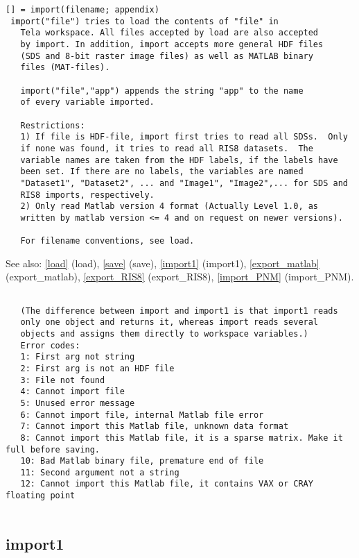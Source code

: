 \documentclass[a4paper]{article}
\begin{document}
\begin{tscreen}
\begin{verbatim}
[] = import(filename; appendix)
 import("file") tries to load the contents of "file" in
   Tela workspace. All files accepted by load are also accepted
   by import. In addition, import accepts more general HDF files
   (SDS and 8-bit raster image files) as well as MATLAB binary
   files (MAT-files).
   
   import("file","app") appends the string "app" to the name
   of every variable imported.
   
   Restrictions:
   1) If file is HDF-file, import first tries to read all SDSs.  Only
   if none was found, it tries to read all RIS8 datasets.  The
   variable names are taken from the HDF labels, if the labels have
   been set. If there are no labels, the variables are named
   "Dataset1", "Dataset2", ... and "Image1", "Image2",... for SDS and
   RIS8 imports, respectively.
   2) Only read Matlab version 4 format (Actually Level 1.0, as
   written by matlab version <= 4 and on request on newer versions).
   
   For filename conventions, see load.
\end{verbatim}

See also: \ref{load} {(load)}, \ref{save} {(save)}, \ref{import1} {(import1)}, \ref{export_matlab} {(export\_matlab)}, \ref{export_RIS8} {(export\_RIS8)}, \ref{import_PNM} {(import\_PNM)}.
\begin{verbatim}
   
   (The difference between import and import1 is that import1 reads
   only one object and returns it, whereas import reads several
   objects and assigns them directly to workspace variables.)
   Error codes:
   1: First arg not string
   2: First arg is not an HDF file
   3: File not found
   4: Cannot import file
   5: Unused error message
   6: Cannot import file, internal Matlab file error
   7: Cannot import this Matlab file, unknown data format
   8: Cannot import this Matlab file, it is a sparse matrix. Make it full before saving.
   10: Bad Matlab binary file, premature end of file
   11: Second argument not a string
   12: Cannot import this Matlab file, it contains VAX or CRAY floating point
   
\end{verbatim}
\end{tscreen}





\subsection{import1\label{import1}}
\end{document}
